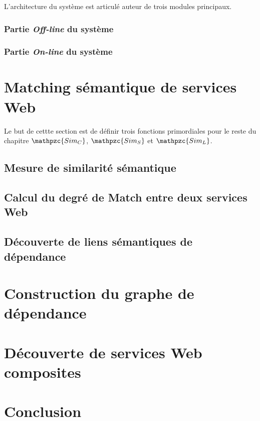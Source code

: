 L'architecture du système est articulé auteur de trois modules
principaux.
\subsubsection{Partie \emph{Off-line} du système}
\label{sec:presentation-architecture-online}

\subsubsection{Partie \emph{On-line} du système}
\label{sec:presentation-architecture-online}

\newpage
\section{Matching sémantique de services Web}
\label{sec:ch3/matching}


Le but de cettte section est de définir trois fonctions primordiales
pour le reste du chapitre {\large $\mathpzc{Sim_C}$, $\mathpzc{Sim_S}$
  et $\mathpzc{Sim_L}$}.

\subsection{Mesure de similarité sémantique }
\label{sec:matching-simc}

\subsection{Calcul du degré de Match entre deux services Web}
\label{sec:matching-sims}

\subsection{Découverte de liens sémantiques de dépendance}
\label{sec:matching-siml}

\newpage
\section{Construction du graphe de dépendance}
\label{sec:ch3/graph}

\section{Découverte de services Web composites}
\label{sec:ch3/composition}

\section*{Conclusion}
\label{sec:ch3/conclusion}
 


